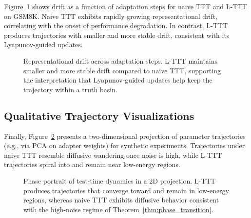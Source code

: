 \documentclass{article}
\theoremstyle{plain}
\theoremstyle{definition}
\theoremstyle{remark}
\begin{document}
Figure~\ref{fig:app-drift} shows drift as a function of adaptation steps for naive TTT and L-TTT on GSM8K. Naive TTT exhibits rapidly growing representational drift, correlating with the onset of performance degradation. In contrast, L-TTT produces trajectories with smaller and more stable drift, consistent with its Lyapunov-guided updates.

\begin{figure}[h]
    \centering
    \caption{Representational drift across adaptation steps. L-TTT maintains smaller and more stable drift compared to naive TTT, supporting the interpretation that Lyapunov-guided updates help keep the trajectory within a truth basin.}
    \label{fig:app-drift}
\end{figure}

\subsection{Qualitative Trajectory Visualizations}

Finally, Figure~\ref{fig:app-phase-portrait} presents a two-dimensional projection of parameter trajectories (e.g., via PCA on adapter weights) for synthetic experiments. Trajectories under naive TTT resemble diffusive wandering once noise is high, while L-TTT trajectories spiral into and remain near low-energy regions.

\begin{figure}[h]
    \centering
    \caption{Phase portrait of test-time dynamics in a 2D projection. L-TTT produces trajectories that converge toward and remain in low-energy regions, whereas naive TTT exhibits diffusive behavior consistent with the high-noise regime of Theorem~\ref{thm:phase_transition}.}
    \label{fig:app-phase-portrait}
\end{figure}
\end{document}
